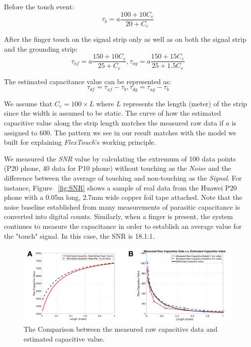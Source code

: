 Before the touch event:
\begin{equation}
    \tau_{b} = a\frac{100 + 10C_{e}}{20+C_{e}}
\end{equation}

After the finger touch on the signal strip only as well as on both the signal strip and the grounding strip: 
\begin{equation}
    \tau_{af} = a\frac{150 + 10C_{e}}{25+C_{e}}, \tau_{ag} = a\frac{150 + 15C_{e}}{25+1.5C_{e}}
\end{equation}

The estimated capacitance value can be represented as:
\begin{equation}
    \tau_{df} = \tau_{af} - \tau_{b},  \tau_{dg} = \tau_{ag} - \tau_{b}
\end{equation}

We assume that $C_{e} = 100 \times L$ where $L$ represents the length (meter) of the strip since the width is assumed to be static. The curve of how the estimated capacitive value along the strip length matches the measured raw data if $a$ is assigned to 600. The pattern we see in our result matches with the model we built for explaining \textit{FlexTouch}'s working principle. 

We measured the \textit{SNR} value by calculating the extremum of 100 data points (P20 phone, 40 data for P10 phone) without touching as the \textit{Noise} and the difference between the average of touching and non-touching as the \textit{Signal}. For instance, Figure ~\ref{fig:SNR} shows a sample of real data from the Huawei P20 phone with a 0.05m long, 2.7mm wide copper foil tape attached. Note that the noise baseline established from many measurements of parasitic capacitance is converted into digital counts. Similarly, when a finger is present, the system continues to measure the capacitance in order to establish an average value for the "touch" signal. In this case, the SNR is 18.1:1.

\begin{figure}[ht]
	\centering
	  \includegraphics[width=0.95\columnwidth]{figures/estimate.png}
	  \caption{The Comparison between the measured raw capacitive data and estimated capacitive value.}
	  \label{fig:estimate}
	\end{figure}
	
